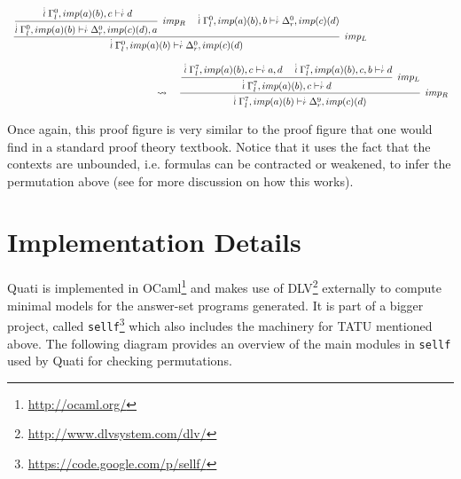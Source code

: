 \documentclass{llncs}
\newcommand{\ndots}[1]{\stackrel{\vcenter{\hbox{$\scriptstyle :$}\vskip-.35ex}}
   {\hbox {$ \scriptstyle {#1}$}}}
\begin{document}
{\scriptsize
\[
\begin{array}{ll}
\cfrac{\cfrac{ \ndots{l} \Gamma_{l}^{0}, imp (a) (b) , c \vdash  \ndots{r} d}
{ \ndots{l} \Gamma_{l}^{0}, imp (a) (b)  \vdash  \ndots{r} \Delta_{r}^{0}, imp (c) (d) , a} \;\; imp_{R}
\quad
 \ndots{l} \Gamma_{l}^{0}, imp (a) (b) , b \vdash  \ndots{r} \Delta_{r}^{0}, imp (c) (d) }
{ \ndots{l} \Gamma_{l}^{0}, imp (a) (b)  \vdash  \ndots{r} \Delta_{r}^{0}, imp (c) (d) } \;\; imp_{L}\\\\
\qquad \qquad \qquad \qquad \qquad \qquad \qquad \quad\rightsquigarrow\quad
\cfrac{\cfrac{ \ndots{l} \Gamma_{l}^{7}, imp (a) (b) , c \vdash  \ndots{r} a, d
\quad
 \ndots{l} \Gamma_{l}^{7}, imp (a) (b) , c, b \vdash  \ndots{r} d}
{ \ndots{l} \Gamma_{l}^{7}, imp (a) (b) , c \vdash  \ndots{r} d} \;\; imp_{L}}
{ \ndots{l} \Gamma_{l}^{7}, imp (a) (b)  \vdash  \ndots{r} \Delta_{r}^{9}, imp (c) (d) } \;\; imp_{R}
\end{array}
\]
}

Once again, this proof figure is very similar to the proof figure that one would find in a standard proof theory textbook.
Notice that it uses the fact that the contexts are unbounded, i.e. formulas can
be contracted or weakened, to infer the permutation above (see \cite{nigam13iclp} for 
more discussion on how this works).

\section{Implementation Details}
\label{sec:impl}

Quati is implemented in OCaml\footnote{\url{http://ocaml.org/}} and makes use of
DLV\footnote{\url{http://www.dlvsystem.com/dlv/}} externally to compute minimal models for the
answer-set programs generated. It is part of a bigger project, called
\texttt{sellf}\footnote{\url{https://code.google.com/p/sellf/}} which also includes the
machinery for TATU mentioned above. The following diagram provides an overview of
the main modules in \texttt{sellf} used by Quati for checking permutations.
\end{document}
